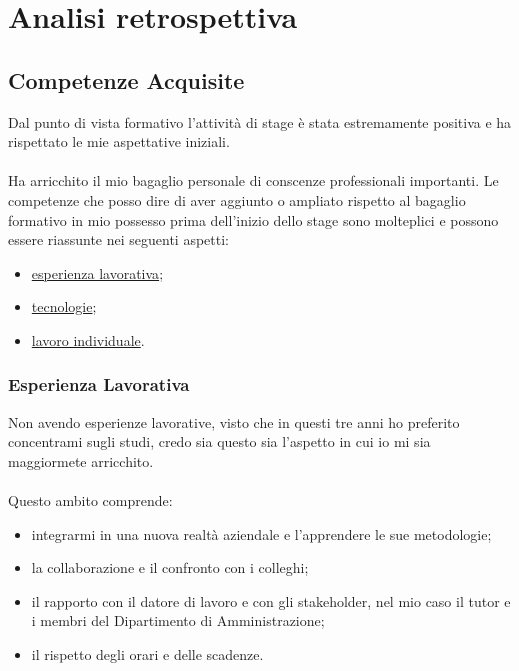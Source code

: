 
\chapter{Analisi retrospettiva}
\label{cap:valutazione}


\section{Competenze Acquisite}
Dal punto di vista formativo l’attività di stage è stata estremamente positiva e ha rispettato le mie aspettative iniziali. \\ \\
Ha arricchito il mio bagaglio personale di conscenze professionali importanti.
Le competenze che posso dire di aver aggiunto o ampliato rispetto al bagaglio formativo
in mio possesso prima dell’inizio dello stage sono molteplici e possono essere riassunte nei
seguenti aspetti:
\begin{itemize}
	\item \hyperref[sub:esplavorativa]{esperienza lavorativa};
	\item \hyperref[sub:tecnologie]{tecnologie};
	\item \hyperref[sub:lavoro]{lavoro individuale}.
\end{itemize}
	
	\subsection{Esperienza Lavorativa}
	\label{sub:esplavorativa}
	Non avendo esperienze lavorative, visto che in questi tre anni ho preferito concentrami
sugli studi, credo sia questo sia l'aspetto in cui io mi sia maggiormete arricchito. \\ \\
	Questo ambito comprende:
	\begin{itemize}
		\item integrarmi in una nuova realtà aziendale e l'apprendere le sue metodologie;
		\item la collaborazione e il confronto con i colleghi;
		\item il rapporto con il datore di lavoro e con gli stakeholder, nel mio caso il tutor e i membri del Dipartimento di Amministrazione;
		\item il rispetto degli orari e delle scadenze.
	\end{itemize}
	
